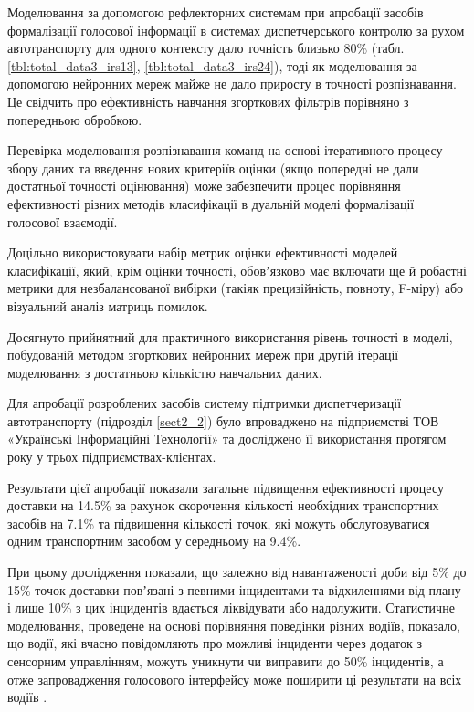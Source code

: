 Моделювання за допомогою рефлекторних системам при апробації засобів формалізації голосової інформації в системах диспетчерського контролю за рухом автотранспорту для одного контексту дало точність близько 80\% (табл. \ref{tbl:total_data3_irs13}, \ref{tbl:total_data3_irs24}), тоді як моделювання за допомогою нейронних мереж майже не дало приросту в точності розпізнавання. Це свідчить про ефективність навчання згорткових фільтрів порівняно з попередньою обробкою.

Перевірка моделювання розпізнавання команд на основі ітеративного процесу збору даних та введення нових критеріїв оцінки (якщо попередні не дали достатньої точності оцінювання) може забезпечити процес порівняння ефективності різних методів класифікації в дуальній моделі формалізації голосової взаємодії.

Доцільно використовувати набір метрик оцінки ефективності моделей класифікації, який, крім оцінки точності, обовʼязково має включати ще й робастні метрики для незбалансованої вибірки (такіяк прецизійність, повноту, F-міру) або візуальний аналіз матриць помилок.

Досягнуто прийнятний для практичного використання рівень точності в моделі, побудованій методом згорткових нейронних мереж при другій ітерації моделювання з достатньою кількістю навчальних даних.

Для апробації розроблених засобів систему підтримки диспетчеризації автотранспорту (підрозділ \ref{sect2_2}) було впроваджено на підприємстві ТОВ «Українські Інформаційні Технології» \cite{SngTrans} та досліджено її використання протягом року у трьох підприємствах-клієнтах.

Результати цієї апробації показали загальне підвищення ефективності процесу доставки на 14.5\% за рахунок скорочення кількості необхідних транспортних засобів на 7.1\% та підвищення кількості точок, які можуть обслуговуватися одним транспортним засобом у середньому на 9.4\%.

При цьому дослідження показали, що залежно від навантаженості доби від 5\% до 15\% точок доставки повʼязані з певними інцидентами та відхиленнями від плану і лише 10\% з цих інцидентів вдається ліквідувати або надолужити. Статистичне моделювання, проведене на основі порівняння поведінки різних водіїв, показало, що водії, які вчасно повідомляють про можливі інциденти через додаток з сенсорним управлінням, можуть уникнути чи виправити до 50\% інцидентів, а отже запровадження голосового інтерфейсу може поширити ці результати на всіх водіїв \cite{SngTrans}.

